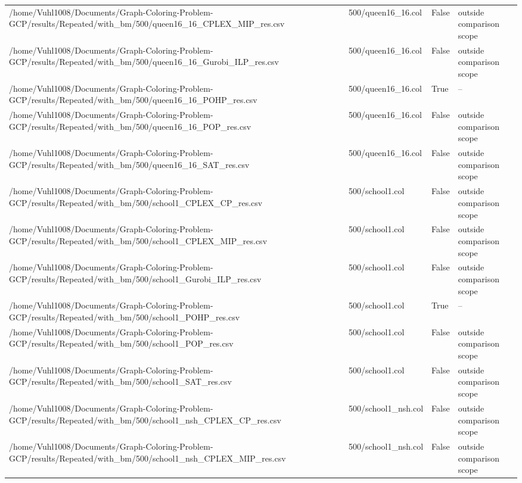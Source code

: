 \begin{table}[htbp]
\begin{tabular}{llll}
/home/Vuhl1008/Documents/Graph-Coloring-Problem-GCP/results/Repeated/with\_bm/500/queen16\_16\_CPLEX\_MIP\_res.csv & 500/queen16\_16.col & False & outside comparison scope \\
/home/Vuhl1008/Documents/Graph-Coloring-Problem-GCP/results/Repeated/with\_bm/500/queen16\_16\_Gurobi\_ILP\_res.csv & 500/queen16\_16.col & False & outside comparison scope \\
/home/Vuhl1008/Documents/Graph-Coloring-Problem-GCP/results/Repeated/with\_bm/500/queen16\_16\_POHP\_res.csv & 500/queen16\_16.col & True & -- \\
/home/Vuhl1008/Documents/Graph-Coloring-Problem-GCP/results/Repeated/with\_bm/500/queen16\_16\_POP\_res.csv & 500/queen16\_16.col & False & outside comparison scope \\
/home/Vuhl1008/Documents/Graph-Coloring-Problem-GCP/results/Repeated/with\_bm/500/queen16\_16\_SAT\_res.csv & 500/queen16\_16.col & False & outside comparison scope \\
/home/Vuhl1008/Documents/Graph-Coloring-Problem-GCP/results/Repeated/with\_bm/500/school1\_CPLEX\_CP\_res.csv & 500/school1.col & False & outside comparison scope \\
/home/Vuhl1008/Documents/Graph-Coloring-Problem-GCP/results/Repeated/with\_bm/500/school1\_CPLEX\_MIP\_res.csv & 500/school1.col & False & outside comparison scope \\
/home/Vuhl1008/Documents/Graph-Coloring-Problem-GCP/results/Repeated/with\_bm/500/school1\_Gurobi\_ILP\_res.csv & 500/school1.col & False & outside comparison scope \\
/home/Vuhl1008/Documents/Graph-Coloring-Problem-GCP/results/Repeated/with\_bm/500/school1\_POHP\_res.csv & 500/school1.col & True & -- \\
/home/Vuhl1008/Documents/Graph-Coloring-Problem-GCP/results/Repeated/with\_bm/500/school1\_POP\_res.csv & 500/school1.col & False & outside comparison scope \\
/home/Vuhl1008/Documents/Graph-Coloring-Problem-GCP/results/Repeated/with\_bm/500/school1\_SAT\_res.csv & 500/school1.col & False & outside comparison scope \\
/home/Vuhl1008/Documents/Graph-Coloring-Problem-GCP/results/Repeated/with\_bm/500/school1\_nsh\_CPLEX\_CP\_res.csv & 500/school1\_nsh.col & False & outside comparison scope \\
/home/Vuhl1008/Documents/Graph-Coloring-Problem-GCP/results/Repeated/with\_bm/500/school1\_nsh\_CPLEX\_MIP\_res.csv & 500/school1\_nsh.col & False & outside comparison scope \\

\end{tabular}
\end{table}
